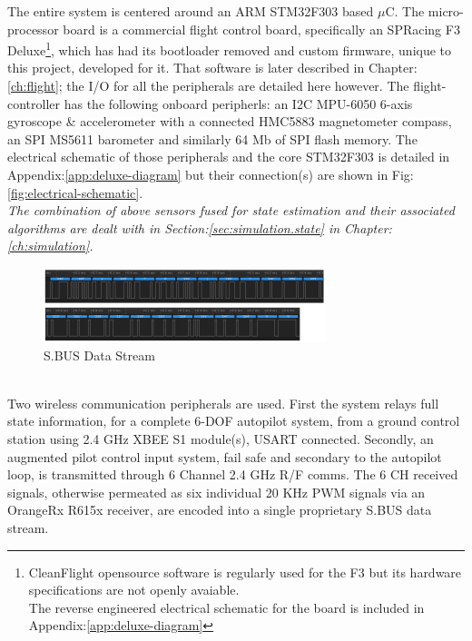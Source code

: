 The entire system is centered around an ARM STM32F303\cite{stm32f303} based $\mu$C. The micro-processor board is a commercial flight control board, specifically an SPRacing F3 Deluxe\cite{spracing}\footnote{CleanFlight opensource software is regularly used for the F3 but its hardware specifications are not openly avaiable.\\The reverse engineered electrical schematic for the board is included in Appendix:\ref{app:deluxe-diagram}}, which has had its bootloader removed and custom firmware, unique to this project, developed for it. That software is later described in Chapter:\ref{ch:flight}; the I/O for all the peripherals are detailed here however. The flight-controller has the following onboard peripherls: an I2C MPU-6050\cite{mpu6050} 6-axis gyroscope \& accelerometer with a connected HMC5883\cite{hmc5883} magnetometer compass, an SPI MS5611\cite{ms5611} barometer and similarly 64 Mb of SPI flash memory. The electrical schematic of those peripherals and the core STM32F303 is detailed in Appendix:\ref{app:deluxe-diagram} but their connection(s) are shown in Fig:\ref{fig:electrical-schematic}. 
\\
\emph{\color{Gray} The combination of above sensors fused for state estimation and their associated algorithms are dealt with in Section:\ref{sec:simulation.state} in Chapter:\ref{ch:simulation}.}
\begin{figure}[hbtp]
\centering
\includegraphics[width=\textwidth]{figs/sbus}
\caption{S.BUS Data Stream}
\label{fig:sbus}
\end{figure}
\\
Two wireless communication peripherals are used. First the system relays full state information, for a complete 6-DOF autopilot system, from a ground control station using 2.4 GHz XBEE S1 module(s)\cite{xbees1}, USART connected. Secondly, an augmented pilot control input system, fail safe and secondary to the autopilot loop, is transmitted through 6 Channel 2.4 GHz R/F comms. The 6 CH received signals, otherwise permeated as six individual 20 KHz PWM signals via an OrangeRx R615x\cite{r615x} receiver, are encoded into a single proprietary S.BUS data stream. 
\newpage
